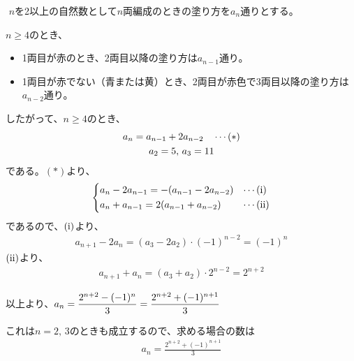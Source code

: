 \documentclass[a4paper]{ltjsarticle}
\begin{document}
\clearpage
{}
\begin{ans*}
  ${}$
  $n$を2以上の自然数として$n$両編成のときの塗り方を$a_{n}$通りとする。

  $n\geq 4$のとき、
  \begin{itemize}
    \item 1両目が赤のとき、2両目以降の塗り方は$a_{n-1}$通り。
    \item 1両目が赤でない（青または黄）とき、2両目が赤色で3両目以降の塗り方は$a_{n-2}$通り。
  \end{itemize}
  したがって、$n\geq 4$のとき、
  \begin{gather*}
    a_{n} = a_{n-1} + 2a_{n-2} \quad \cdots\rm{(*)} \\
    a_{2} = 5,\,a_{3} = 11
  \end{gather*}
  である。$(*)$より、
  \begin{align*}
    \begin{dcases}
      a_{n} - 2a_{n-1} = -(a_{n-1} - 2a_{n-2}) &\cdots\rm{(i)} \\
      a_{n} + a_{n-1} = 2(a_{n-1} + a_{n-2}) &\cdots\rm{(ii)}
    \end{dcases}
  \end{align*}
  であるので、$\rm{(i)}$より、
  \begin{gather*}
    a_{n+1} - 2a_{n}
    = (a_{3} - 2a_{2}) \cdot (-1)^{n-2}
    = (-1)^{n}
  \end{gather*}
  $\rm{(ii)}$より、
  \begin{gather*}
    a_{n+1} + a_{n}
    = (a_{3} + a_{2}) \cdot 2^{n-2}
    = 2^{n+2}
  \end{gather*}

  以上より、$\disp a_{n} = \frac{2^{n+2} - (-1)^{n}}{3} = \frac{2^{n+2} + (-1)^{n+1}}{3}$

  これは$n=2,\,3$のときも成立するので、求める場合の数は
  \begin{gather*}
    a_{n} = \frac{2^{n+2} + (-1)^{n+1}}{3}
  \end{gather*}
\end{ans*}
\end{document}
